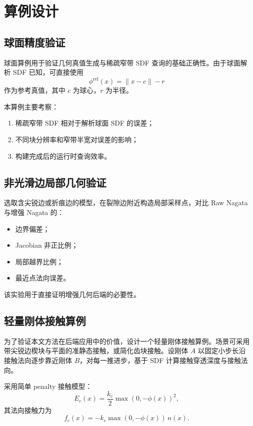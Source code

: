 \documentclass[11pt,a4paper]{ctexart}
\begin{document}
\section{算例设计}

\subsection{球面精度验证}
球面算例用于验证几何真值生成与稀疏窄带 SDF 查询的基础正确性。由于球面解析 SDF 已知，可直接使用
\[
\phi^{\mathrm{ref}}(x)=\|x-c\|-r
\]
作为参考真值，其中 $c$ 为球心，$r$ 为半径。

本算例主要考察：
\begin{enumerate}[leftmargin=2em]
    \item 稀疏窄带 SDF 相对于解析球面 SDF 的误差；
    \item 不同块分辨率和窄带半宽对误差的影响；
    \item 构建完成后的运行时查询效率。
\end{enumerate}

\subsection{非光滑边局部几何验证}
选取含尖锐边或折痕边的模型，在裂隙边附近构造局部采样点，对比 Raw Nagata 与增强 Nagata 的：
\begin{itemize}[leftmargin=2em]
    \item 边界偏差；
    \item Jacobian 非正比例；
    \item 局部越界比例；
    \item 最近点法向误差。
\end{itemize}
该实验用于直接证明增强几何后端的必要性。

\subsection{轻量刚体接触算例}
为了验证本文方法在后端应用中的价值，设计一个轻量刚体接触算例。场景可采用带尖锐边楔块与平面的准静态接触，或简化齿块接触。设刚体 $A$ 以固定小步长沿接触法向逐步靠近刚体 $B$，对每一推进步，基于 SDF 计算接触穿透深度与接触法向。

采用简单 penalty 接触模型：
\begin{equation}
E_c(x)=\frac{k_c}{2}\max(0,-\phi(x))^2,
\end{equation}
其法向接触力为
\begin{equation}
f_c(x)= -k_c \max(0,-\phi(x))\, n(x).
\end{equation}
\end{document}

